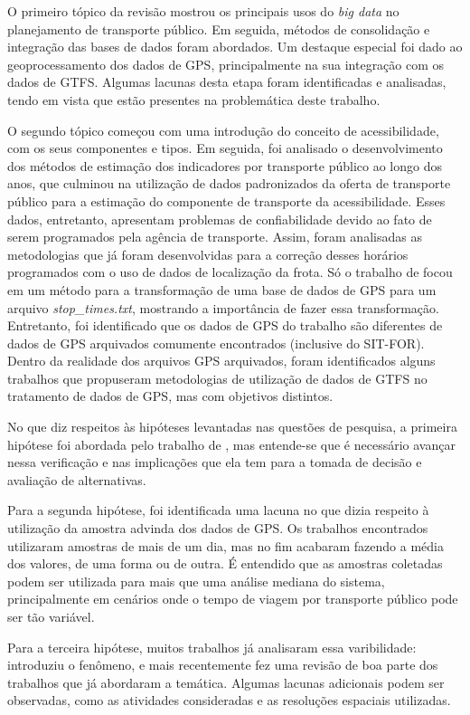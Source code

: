 \documentclass[        
    a4paper,          %
    12pt,             %
    chapter=TITLE,    %
    section=Title,    %
    subsection=Title, %
    oneside,          %
    english,          %
    spanish,          %
    brazil,           %
    fleqn             %
]{abntex2}
\begin{document}
  O primeiro tópico da revisão mostrou os principais usos do \emph{big data} no planejamento de transporte público. Em seguida, métodos de consolidação e integração das bases de dados foram abordados. Um destaque especial foi dado ao geoprocessamento dos dados de GPS, principalmente na sua integração com os dados de GTFS. Algumas lacunas desta etapa foram identificadas e analisadas, tendo em vista que estão presentes na problemática deste trabalho.
  
  O segundo tópico começou com uma introdução do conceito de acessibilidade, com os seus componentes e tipos. Em seguida, foi analisado o desenvolvimento dos métodos de estimação dos indicadores por transporte público ao longo dos anos, que culminou na utilização de dados padronizados da oferta de transporte público para a estimação do componente de transporte da acessibilidade. Esses dados, entretanto, apresentam problemas de confiabilidade devido ao fato de serem programados pela agência de transporte. Assim, foram analisadas as metodologias que já foram desenvolvidas para a correção desses horários programados com o uso de dados de localização da frota. Só o trabalho de \citet{Wessel2017} focou em um método para a transformação de uma base de dados de GPS para um arquivo \emph{stop\_times.txt}, mostrando a importância de fazer essa transformação. Entretanto, foi identificado que os dados de GPS do trabalho são diferentes de dados de GPS arquivados comumente encontrados (inclusive do SIT-FOR). Dentro da realidade dos arquivos GPS arquivados, foram identificados alguns trabalhos que propuseram metodologias de utilização de dados de GTFS no tratamento de dados de GPS, mas com objetivos distintos.
  
  No que diz respeitos às hipóteses levantadas nas questões de pesquisa, a primeira hipótese foi abordada pelo trabalho de \citet{Wessel2017}, mas entende-se que é necessário avançar nessa verificação e nas implicações que ela tem para a tomada de decisão e avaliação de alternativas.
  
  Para a segunda hipótese, foi identificada uma lacuna no que dizia respeito à utilização da amostra advinda dos dados de GPS. Os trabalhos encontrados utilizaram amostras de mais de um dia, mas no fim acabaram fazendo a média dos valores, de uma forma ou de outra. É entendido que as amostras coletadas podem ser utilizada para mais que uma análise mediana do sistema, principalmente em cenários onde o tempo de viagem por transporte público pode ser tão variável.
  
  Para a terceira hipótese, muitos trabalhos já analisaram essa varibilidade: \citet{Owen2015} introduziu o fenômeno, e mais recentemente \citet{Stepniak2019} fez uma revisão de boa parte dos trabalhos que já abordaram a temática. Algumas lacunas adicionais podem ser observadas, como as atividades consideradas e as resoluções espaciais utilizadas.
  
\end{document}
